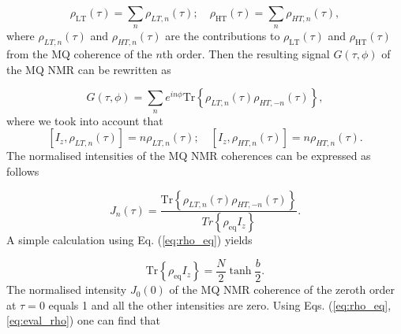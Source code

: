 \documentclass[%
 reprint,
superscriptaddress,
 amsmath,amssymb,
]{revtex4-2}
\begin{document}
\begin{equation}
    \label{eq:rho_series}
    \rho_\mathrm{LT} (\tau) = \sum_n \rho_{LT, n}(\tau); \quad
    \rho_\mathrm{HT} (\tau) = \sum_n \rho_{HT, n}(\tau),
\end{equation}
where $\rho_{LT, n} (\tau)$ and $\rho_{HT, n} (\tau)$ are the contributions to $\rho_\mathrm{LT} (\tau)$ and $\rho_\mathrm{HT} (\tau)$ from the MQ coherence of the $n$th order. Then the resulting signal $G(\tau, \phi)$ of the MQ NMR \cite{mq_nmr_experiment} can be rewritten as 

\begin{equation}
    \label{eq:signal_series}
    G(\tau, \phi) = \sum\limits_n 
    e^{in\phi}\mathrm{Tr} \left\{
    \rho_{LT, n}(\tau) \rho_{HT, -n} (\tau)
    \right\},
\end{equation}
where we took into account that
\begin{equation}
    \left[I_z, \rho_{LT, n} (\tau) \right] = n  \rho_{LT, n} (\tau);
    \quad 
    \left[I_z, \rho_{HT, n} (\tau) \right] = n  \rho_{HT, n} (\tau).
\end{equation}
The normalised intensities of the MQ NMR coherences can be expressed as follows 

\begin{equation}
    \label{eq:coherence}
    J_n(\tau) = 
    \dfrac{
       \mathrm{Tr} \left\{
        \rho_{LT, n}(\tau) \rho_{HT, -n} (\tau)
        \right\}
    }{Tr \left\{\rho_{\mathrm{eq}}I_z\right\}}.
\end{equation}
A simple calculation using Eq.   (\ref{eq:rho_eq}) yields \cite{lab:low_temp_dyn_1997}

\begin{equation}
   \mathrm{Tr} \left\{\rho_{\mathrm{eq}}I_z\right\} = 
    \frac N 2 \tanh \frac b 2.
\end{equation}
The normalised intensity $J_0(0)$ of the MQ NMR coherence of the zeroth order at $\tau=0$ equals 1 and all the other intensities are zero. Using Eqs.   (\ref{eq:rho_eq}, \ref{eq:eval_rho}) one can find that
\end{document}
